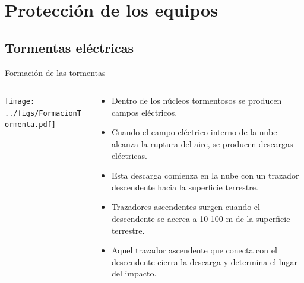 \documentclass[aspectratio=169, usenames,svgnames,dvipsnames]{beamer}
\begin{document}
\section{Protección de los equipos}
\label{sec:orgb29cc8c}

\subsection{Tormentas eléctricas}
\label{sec:orgad3161b}

\begin{frame}[label={sec:orga777bc1}]{Formación de las tormentas}
\begin{columns}
\begin{column}{0.5\columnwidth}
\begin{center}
\texttt{[image: ../figs/FormacionTormenta.pdf]}
\end{center}
\end{column}

\begin{column}{0.5\columnwidth}
\begin{itemize}
\item Dentro de los núcleos tormentosos se producen campos eléctricos.

\item Cuando el campo eléctrico interno de la nube alcanza la ruptura del
aire, se producen descargas eléctricas.

\item \alert{Esta descarga comienza en la nube} con un \alert{trazador descendente} hacia
la superficie terrestre.

\item Trazadores ascendentes surgen cuando el descendente se acerca a
10-100 m de la superficie terrestre.

\item Aquel trazador ascendente que conecta con el descendente cierra la
descarga y determina el lugar del impacto.
\end{itemize}
\end{column}
\end{columns}
\end{frame}
\end{document}
